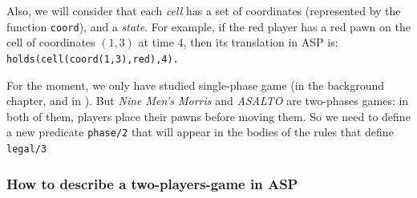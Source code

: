 \bigskip

Also, we will consider that each \textit{cell} has a set of coordinates (represented by the function \texttt{coord}), and a \textit{state}. For example, if the red player has a red pawn on the cell of coordinates $(1,3)$ at time $4$, then its translation in ASP is: \texttt{holds(cell(coord(1,3),red),4).}

\bigskip

For the moment, we only have studied single-phase game (in the background chapter, and in \cite{thielscher2009answer}). But \textit{Nine Men's Morris} and \textit{ASALTO} are two-phases games: in both of them, players place their pawns before moving them. So we need to define a new predicate \texttt{phase/2} that will appear in the bodies of the rules that define \texttt{legal/3}

\subsubsection{How to describe a two-players-game in ASP}

